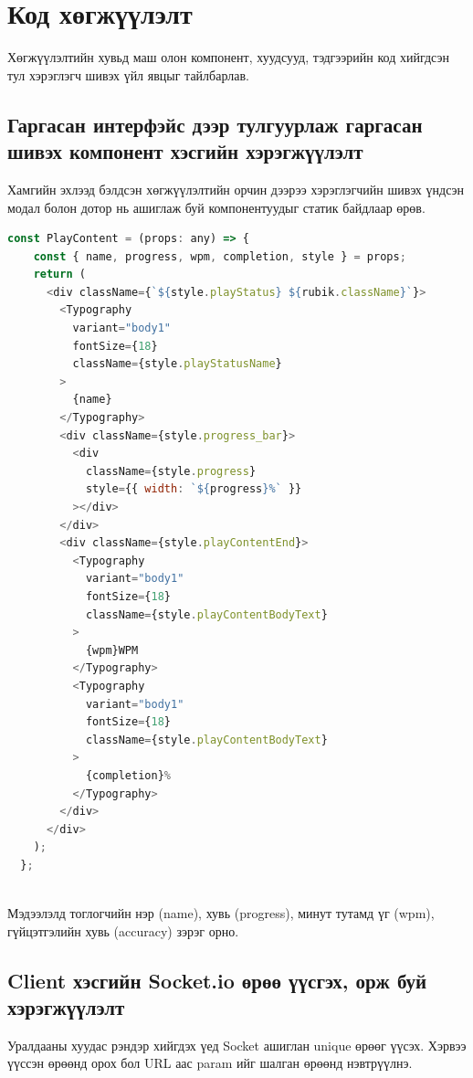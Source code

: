 \section{Код хөгжүүлэлт}

Хөгжүүлэлтийн хувьд маш олон компонент, хуудсууд, тэдгээрийн код хийгдсэн тул хэрэглэгч шивэх үйл явцыг тайлбарлав.

\subsection{Гаргасан интерфэйс дээр тулгуурлаж гаргасан шивэх компонент хэсгийн хэрэгжүүлэлт}

Хамгийн эхлээд бэлдсэн хөгжүүлэлтийн орчин дээрээ хэрэглэгчийн шивэх үндсэн модал болон дотор нь ашиглаж буй компонентуудыг статик байдлаар өрөв.

\begin{lstlisting}[language=Javascript, caption=Хэрэглэгчийн мэдээллийг бодит хугацаанд харуулах компонент, frame=single]
  const PlayContent = (props: any) => {
    const { name, progress, wpm, completion, style } = props;
    return (
      <div className={`${style.playStatus} ${rubik.className}`}>
        <Typography
          variant="body1"
          fontSize={18}
          className={style.playStatusName}
        >
          {name}
        </Typography>
        <div className={style.progress_bar}>
          <div
            className={style.progress}
            style={{ width: `${progress}%` }}
          ></div>
        </div>
        <div className={style.playContentEnd}>
          <Typography
            variant="body1"
            fontSize={18}
            className={style.playContentBodyText}
          >
            {wpm}WPM
          </Typography>
          <Typography
            variant="body1"
            fontSize={18}
            className={style.playContentBodyText}
          >
            {completion}%
          </Typography>
        </div>
      </div>
    );
  };
			
\end{lstlisting}

Мэдээлэлд тоглогчийн нэр (name), хувь (progress), минут тутамд үг (wpm), гүйцэтгэлийн хувь (accuracy) зэрэг орно.

\subsection{Client хэсгийн Socket.io өрөө үүсгэх, орж буй хэрэгжүүлэлт}

Уралдааны хуудас рэндэр хийгдэх үед Socket ашиглан unique өрөөг үүсэх. Хэрвээ үүссэн өрөөнд орох бол URL аас param ийг шалган өрөөнд нэвтрүүлнэ.

